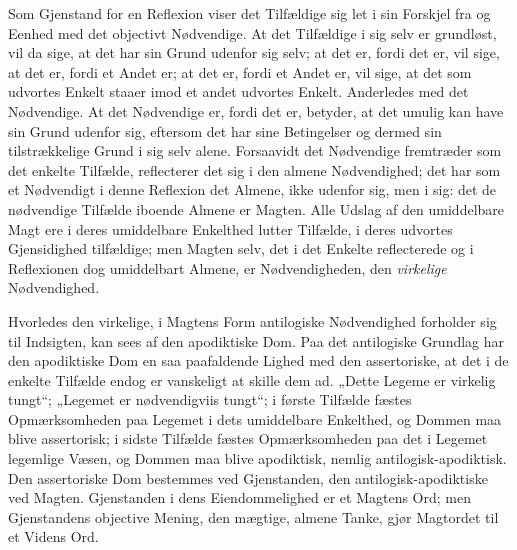 \documentclass[12pt]{book}
\newcommand{\opage}[1]{\marginnote{\footnotesize\textit{[#1]}}}
\begin{document}
Som Gjenstand for en Reflexion viser det Tilfældige sig let i sin Forskjel fra og Eenhed med det objectivt Nødvendige. At det Tilfældige i sig selv er grundløst, vil da sige, at det har sin Grund udenfor sig selv; at det er, fordi det er, vil sige, at det er, fordi et Andet er;
at det er, fordi et Andet er, vil sige, at det som udvortes Enkelt staaer imod et andet udvortes Enkelt. Anderledes med det Nødvendige. At det Nødvendige er, fordi det er, betyder, at det umulig kan have sin Grund udenfor sig, eftersom det har sine Betingelser og dermed sin tilstrækkelige Grund i sig selv alene. Forsaavidt det Nødvendige fremtræder som det enkelte Tilfælde, reflecterer det sig i den almene Nødvendighed; det har som et Nødvendigt i denne Reflexion det Almene, ikke udenfor sig, men i sig: det de nødvendige Tilfælde iboende Almene er Magten. Alle Udslag af den umiddelbare Magt ere i deres umiddelbare Enkelthed lutter Tilfælde, i deres udvortes Gjensidighed tilfældige; men Magten selv, det i det Enkelte reflecterede og i Reflexionen dog umiddelbart Almene, er Nødvendigheden, den \emph{virkelige} Nødvendighed.

Hvorledes den virkelige, i Magtens Form antilogiske Nødvendighed forholder sig til Indsigten, kan sees af den apodiktiske Dom. Paa det antilogiske Grundlag har den apodiktiske Dom en saa paafaldende Lighed med den assertoriske, at det i de enkelte Tilfælde endog er vanskeligt at skille dem ad. „Dette Legeme er virkelig tungt“; „Legemet er nødvendigviis tungt“; i første Tilfælde fæstes Opmærksomheden paa Legemet
\opage{266}i dets umiddelbare Enkelthed, og Dommen maa blive assertorisk; i sidste Tilfælde fæstes Opmærksomheden paa det i Legemet legemlige Væsen, og Dommen maa blive apodiktisk, nemlig antilogisk-apodiktisk. Den assertoriske Dom bestemmes ved Gjenstanden, den antilogisk-apodiktiske ved Magten. Gjenstanden i dens Eiendommelighed er et Magtens Ord; men Gjenstandens objective Mening, den mægtige, almene Tanke, gjør Magtordet til et Videns Ord.
\end{document}
